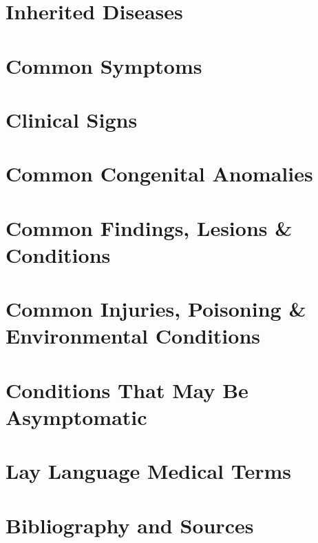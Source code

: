 \documentclass[11pt,twocolumn,twoside]{book}
\newcommand{\1}{\ifmmode\mathbin{\%}\else\%\fi}
\begin{document}
\clearpage
\chapter{Inherited Diseases}


\clearpage
\chapter{Common Symptoms}


\clearpage
\chapter{Clinical Signs}


\clearpage
\chapter{Common Congenital Anomalies}


\clearpage
\chapter{Common Findings, Lesions \& Conditions}


\clearpage
\chapter{Common Injuries, Poisoning \& Environmental Conditions}


\clearpage
\chapter{Conditions That May Be Asymptomatic}


\clearpage
\chapter{Lay Language Medical Terms}


\clearpage
\onecolumn
\chapter*{Bibliography and Sources}

\twocolumn

{}
\printindex
\end{document}
